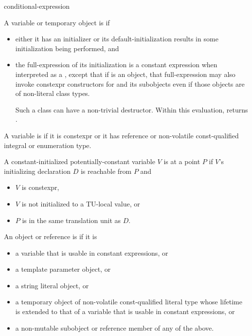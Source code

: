 \begin{bnf}
\br
    conditional-expression
\end{bnf}

\pnum
A variable or temporary object  is  if
\begin{itemize}
\item
  either it has an initializer or
  its default-initialization results in some initialization being performed, and
\item
  the full-expression of its initialization is a constant expression
  when interpreted as a ,
  except that if  is an object,
  that full-expression
  may also invoke constexpr constructors
  for  and its subobjects
  even if those objects are of non-literal class types.
  \begin{note}
  Such a class can have a non-trivial destructor.
  Within this evaluation,
  returns .
\end{note}
\end{itemize}

\pnum
A variable is  if
it is constexpr or
it has reference or non-volatile const-qualified integral or enumeration type.

\pnum
A constant-initialized potentially-constant variable $V$ is
 at a point $P$ if
$V$'s initializing declaration $D$ is reachable from $P$ and
\begin{itemize}
\item $V$ is constexpr,
\item $V$ is not initialized to a TU-local value, or
\item $P$ is in the same translation unit as $D$.
\end{itemize}
An object or reference is  if it is
\begin{itemize}
\item a variable that is usable in constant expressions, or
\item a template parameter object, or
\item a string literal object, or
\item a temporary object of non-volatile const-qualified literal type
  whose lifetime is extended
  to that of a variable that is usable in constant expressions, or
\item a non-mutable subobject or reference member of any of the above.
\end{itemize}

